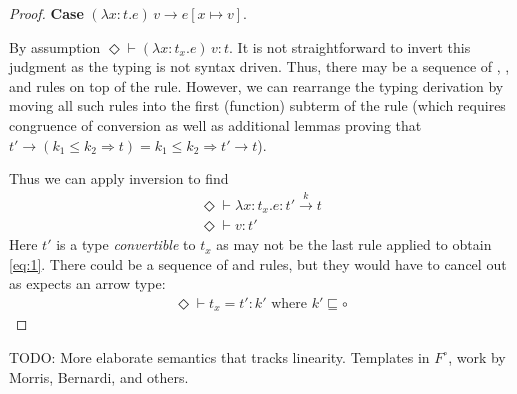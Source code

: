 \documentclass{article}
\newcommand{\ONE}{\circ}
\newcommand{\TASS}[1]{#1\colon\!}
\newcommand{\LAM}[2]{\lambda\TASS{#1}#2.}
\newcommand{\APP}[1]{#1\,}
\newcommand{\TENVEMPTY}{\Diamond}
\newcommand\stepsto{\longrightarrow}
\begin{document}
\begin{proof}
  \textbf{Case} ${\APP{(\LAM x t e)}v \stepsto e[x \mapsto v]}$.

  By assumption $\TENVEMPTY \vdash \APP{(\LAM x {t_x} e)}v : t$.
  It is not straightforward to invert this judgment as the typing is
  not syntax driven. Thus, there may be a sequence of ,
  , and  rules on top of the
   rule. However, we can rearrange the typing derivation
  by moving all such rules into the first (function) subterm of the
   rule (which requires congruence of conversion as well
  as additional lemmas proving that $t' \to (k_1\le k_2 \Rightarrow t) = k_1\le k_2
  \Rightarrow t' \to t$).

  Thus we can apply inversion to find
  \begin{gather}
    \label{eq:1}
    \TENVEMPTY \vdash \LAM x {t_x} e : t' \stackrel{k}\to t
    \\
    \label{eq:2}
    \TENVEMPTY \vdash v : t'
  \end{gather}
  Here $t'$ is a type \emph{convertible} to $t_x$ as  may
  not be the last rule applied to obtain \eqref{eq:1}. There could be
  a sequence of  and  rules, but they
  would have to cancel out as  expects an arrow type:
  \begin{gather}
    \label{eq:3}
    \TENVEMPTY \vdash t_x = t' : k' \text{ where }k' \sqsubseteq \ONE
  \end{gather}
\end{proof}

TODO: More elaborate semantics that tracks linearity.
Templates in $F^{\ONE}$, work by Morris, Bernardi, and others.
\end{document}
